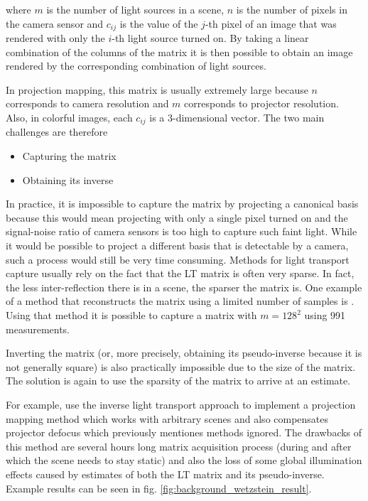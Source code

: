 where \(m\) is the number of light sources in a scene, \(n\) is the number of pixels in the camera sensor and \(c_{ij}\) is the value of the \(j\)-th pixel of an image that was rendered with only the \(i\)-th light source turned on. By taking a linear combination of the columns of the matrix it is then possible to obtain an image rendered by the corresponding combination of light sources.

In projection mapping, this matrix is usually extremely large because \(n\) corresponds to camera resolution and \(m\) corresponds to projector resolution. Also, in colorful images, each \(c_{ij}\) is a 3-dimensional vector. The two main challenges are therefore

\begin{itemize}
    \item Capturing the matrix
    \item Obtaining its inverse
\end{itemize}

In practice, it is impossible to capture the matrix by projecting a canonical basis because this would mean projecting with only a single pixel turned on and the signal-noise ratio of camera sensors is too high to capture such faint light. While it would be possible to project a different basis that is detectable by a camera, such a process would still be very time consuming. Methods for light transport capture usually rely on the fact that the LT matrix is often very sparse. In fact, the less inter-reflection there is in a scene, the sparser the matrix is. One example of a method that reconstructs the matrix using a limited number of samples is \citet{Peers2009}. Using that method it is possible to capture a matrix with \(m = 128^2\) using 991 measurements.

Inverting the matrix (or, more precisely, obtaining its pseudo-inverse because it is not generally square) is also practically impossible due to the size of the matrix. The solution is again to use the sparsity of the matrix to arrive at an estimate.

For example, \citet{Wetzstein2007} use the inverse light transport approach to implement a projection mapping method which works with arbitrary scenes and also compensates projector defocus which previously mentiones methods ignored. The drawbacks of this method are several hours long matrix acquisition process (during and after which the scene needs to stay static) and also the loss of some global illumination effects caused by estimates of both the LT matrix and its pseudo-inverse. Example results can be seen in fig. \ref{fig:background_wetzstein_result}.

